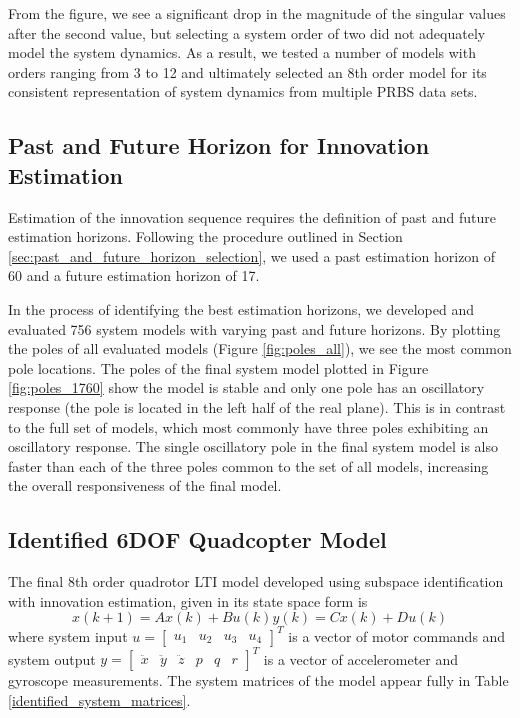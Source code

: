 From the figure, we see a significant drop in the magnitude of the singular values after the second value, but selecting a system order of two did not adequately model the system dynamics. As a result, we tested a number of models with orders ranging from 3 to 12 and ultimately selected an 8th order model for its consistent representation of system dynamics from multiple PRBS data sets.

\subsection{Past and Future Horizon for Innovation Estimation}
Estimation of the innovation sequence requires the definition of past and future estimation horizons. Following the procedure outlined in Section \ref{sec:past_and_future_horizon_selection}, we used a past estimation horizon of 60 and a future estimation horizon of 17. 

In the process of identifying the best estimation horizons, we developed and evaluated 756 system models with varying past and future horizons. By plotting the poles of all evaluated models (Figure \ref{fig:poles_all}), we see the most common pole locations. The poles of the final system model plotted in Figure \ref{fig:poles_1760} show the model is stable and only one pole has an oscillatory response (the pole is located in the left half of the real plane). This is in contrast to the full set of models, which most commonly have three poles exhibiting an oscillatory response. The single oscillatory pole in the final system model is also faster than each of the three poles common to the set of all models, increasing the overall responsiveness of the final model. 

\subsection{Identified 6DOF Quadcopter Model}
The final 8th order quadrotor LTI model developed using subspace identification with innovation estimation, given in its state space form is 
\begin{subequations}\label{eq:2_lti}
\begin{equation*}x(k+1) = Ax(k) + Bu(k)\end{equation*}
\begin{equation*}y(k) = Cx(k) + Du(k)\end{equation*}
\end{subequations}
where system input $u = \begin{bmatrix}u_1 & u_2 & u_3 & u_4\end{bmatrix}^T$ is a vector of motor commands and system output $y = \begin{bmatrix}\ddot x & \ddot y & \ddot z & p & q & r\end{bmatrix}^T$ is a vector of accelerometer and gyroscope measurements. The system matrices of the model appear fully in Table \ref{identified_system_matrices}.

